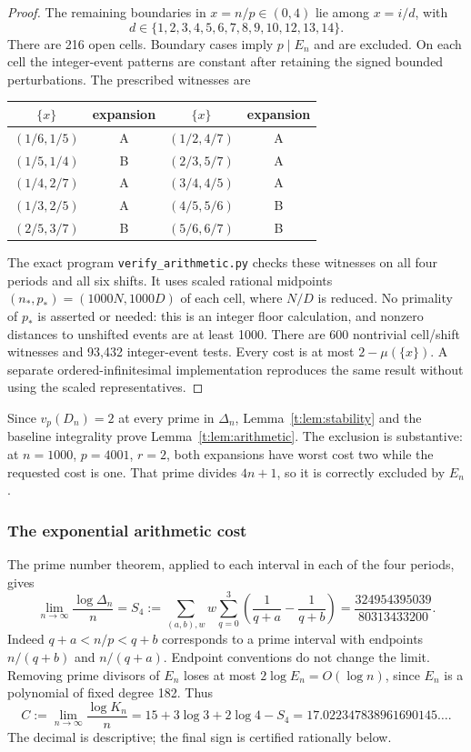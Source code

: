 \documentclass[11pt]{amsart}
\newcommand{\vp}{v_p}
\theoremstyle{plain}
\theoremstyle{remark}\newtheorem{remark}[theorem]{Remark}
\numberwithin{equation}{section}
\begin{document}
\begin{proof}
The remaining boundaries in $x=n/p\in(0,4)$ lie among $x=i/d$, with
\[
 d\in\{1,2,3,4,5,6,7,8,9,10,12,13,14\}.
\]
There are 216 open cells. Boundary cases imply $p\mid E_n$ and are excluded.
On each cell the integer-event patterns are constant after retaining the
signed bounded perturbations. The prescribed witnesses are
\begin{center}
\begin{tabular}{cc@{\qquad}cc}
\toprule
$\{x\}$ & expansion & $\{x\}$ & expansion\\
\midrule
$(1/6,1/5)$&A&$(1/2,4/7)$&A\\
$(1/5,1/4)$&B&$(2/3,5/7)$&A\\
$(1/4,2/7)$&A&$(3/4,4/5)$&A\\
$(1/3,2/5)$&A&$(4/5,5/6)$&B\\
$(2/5,3/7)$&B&$(5/6,6/7)$&B\\
\bottomrule
\end{tabular}
\end{center}
The exact program \texttt{verify\_arithmetic.py} checks these witnesses on
all four periods and all six shifts. It uses scaled rational midpoints
$(n_*,p_*)=(1000N,1000D)$ of each cell, where $N/D$ is reduced. No primality
of $p_*$ is asserted or needed: this is an integer floor calculation, and
nonzero distances to unshifted events are at least 1000. There are 600
nontrivial cell/shift witnesses and 93,432 integer-event tests. Every cost
is at most $2-\mu(\{x\})$. A separate ordered-infinitesimal implementation
reproduces the same result without using the scaled representatives.
\end{proof}

Since $\vp(D_n)=2$ at every prime in $\Delta_n$, Lemma~\ref{t:lem:stability}
and the baseline integrality prove Lemma~\ref{t:lem:arithmetic}.
The exclusion is substantive: at $n=1000$, $p=4001$, $r=2$, both expansions
have worst cost two while the requested cost is one. That prime divides
$4n+1$, so it is correctly excluded by $E_n$.

\subsubsection{The exponential arithmetic cost}
The prime number theorem, applied to each interval in each of the four
periods, gives
\begin{equation}\label{t:eq:saving}
 \lim_{n\to\infty}\frac{\log\Delta_n}{n}
 =S_4:=\sum_{(a,b),w}w\sum_{q=0}^{3}
        \left(\frac1{q+a}-\frac1{q+b}\right)
 =\frac{324954395039}{80313433200}.
\end{equation}
Indeed $q+a<n/p<q+b$ corresponds to a prime interval with endpoints
$n/(q+b)$ and $n/(q+a)$. Endpoint conventions do not change the limit.
Removing prime divisors of $E_n$ loses at most $2\log E_n=O(\log n)$,
since $E_n$ is a polynomial of fixed degree 182. Thus
\begin{equation}\label{t:eq:C}
 C:=\lim_{n\to\infty}\frac{\log K_n}{n}
 =15+3\log3+2\log4-S_4
 =17.022347838961690145\ldots.
\end{equation}
The decimal is descriptive; the final sign is certified rationally below.
\end{document}
